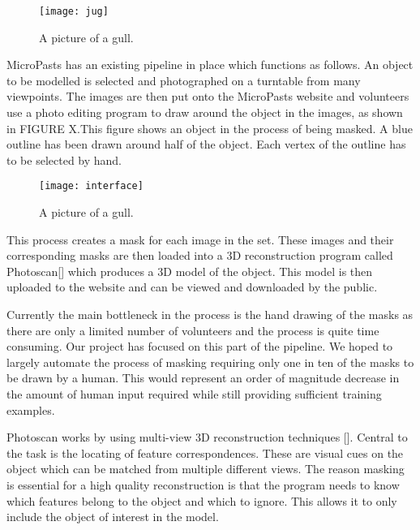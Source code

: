 \documentclass[12pt]{IIBproject}
\begin{document}
\begin{figure}[H]
  \caption{A picture of a gull.}
  \centering
    \texttt{[image: jug]}
\end{figure}

 MicroPasts has an existing pipeline in place which functions as follows. An object to be modelled is selected and photographed on a turntable from many viewpoints. The images are then put onto the MicroPasts website and volunteers use a photo editing program to draw around the object in the images, as shown in FIGURE X.This figure shows an object in the process of being masked. A blue outline has been drawn around half of the object. Each vertex of the outline has to be selected by hand.
\begin{figure}[H]
  \caption{A picture of a gull.}
  \centering
    \texttt{[image: interface]}
\end{figure} 
  This process creates a mask for each image in the set. These images and their corresponding masks are then loaded into a 3D reconstruction program called Photoscan[] which produces a 3D model of the object. This model is then uploaded to the website and can be viewed and downloaded by the public. 

Currently the main bottleneck in the process is the hand drawing of the masks as there are only a limited number of volunteers and the process is quite time consuming. Our project has focused on this part of the pipeline. We hoped to largely automate the process of masking requiring only one in ten of the masks to be drawn by a human. This would represent an order of magnitude decrease in the amount of human input required while still providing sufficient training examples. 

Photoscan works by using multi-view 3D reconstruction techniques []. Central to the task is the locating of feature correspondences. These are visual cues on the object which can be matched from multiple different views. The reason masking is essential for a high quality reconstruction is that the program needs to know which features belong to the object and which to ignore. This allows it to only include the object of interest in the model.
\end{document}
